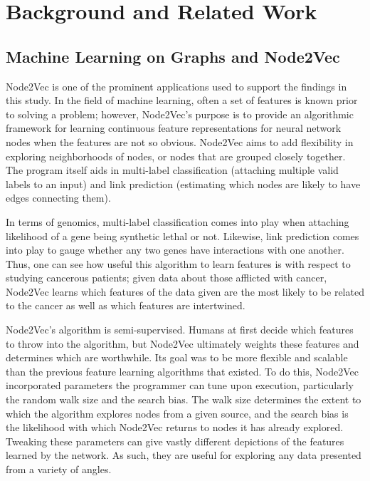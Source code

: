\section{Background and Related Work} %
\label{sec:background}

\subsection{Machine Learning on Graphs and Node2Vec} %
\label{sec:node2vec}

Node2Vec is one of the prominent applications used to support the findings in this study. In the field of machine learning, often a set of features is known prior to solving a problem; however, Node2Vec's purpose is to provide an algorithmic framework for learning continuous feature representations for neural network nodes when the features are not so obvious. Node2Vec aims to add flexibility in exploring neighborhoods of nodes, or nodes that are grouped closely together. The program itself aids in multi-label classification (attaching multiple valid labels to an input) and link prediction (estimating which nodes are likely to have edges connecting them).

In terms of genomics, multi-label classification comes into play when attaching likelihood of a gene being synthetic lethal or not. Likewise, link prediction comes into play to gauge whether any two genes have interactions with one another. Thus, one can see how useful this algorithm to learn features is with respect to studying cancerous patients; given data about those afflicted with cancer, Node2Vec learns which features of the data given are the most likely to be related to the cancer as well as which features are intertwined.

Node2Vec's algorithm is semi-supervised. Humans at first decide which features to throw into the algorithm, but Node2Vec ultimately weights these features and determines which are worthwhile. Its goal was to be more flexible and scalable than the previous feature learning algorithms that existed. To do this, Node2Vec incorporated parameters the programmer can tune upon execution, particularly the random walk size and the search bias. The walk size determines the extent to which the algorithm explores nodes from a given source, and the search bias is the likelihood with which Node2Vec returns to nodes it has already explored. Tweaking these parameters can give vastly different depictions of the features learned by the network. As such, they are useful for exploring any data presented from a variety of angles.

